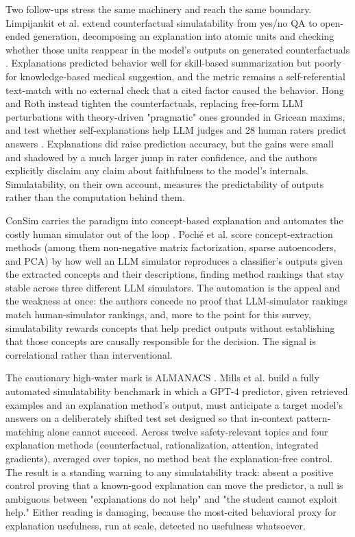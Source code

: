 \documentclass[conference]{IEEEtran}
\begin{document}
Two follow-ups stress the same machinery and reach the same boundary. Limpijankit et al. extend counterfactual simulatability from yes/no QA to open-ended generation, decomposing an explanation into atomic units and checking whether those units reappear in the model's outputs on generated counterfactuals \cite{ref50}. Explanations predicted behavior well for skill-based summarization but poorly for knowledge-based medical suggestion, and the metric remains a self-referential text-match with no external check that a cited factor caused the behavior. Hong and Roth instead tighten the counterfactuals, replacing free-form LLM perturbations with theory-driven "pragmatic" ones grounded in Gricean maxims, and test whether self-explanations help LLM judges and 28 human raters predict answers \cite{ref51}. Explanations did raise prediction accuracy, but the gains were small and shadowed by a much larger jump in rater confidence, and the authors explicitly disclaim any claim about faithfulness to the model's internals. Simulatability, on their own account, measures the predictability of outputs rather than the computation behind them.

ConSim carries the paradigm into concept-based explanation and automates the costly human simulator out of the loop \cite{ref27}. Poché et al. score concept-extraction methods (among them non-negative matrix factorization, sparse autoencoders, and PCA) by how well an LLM simulator reproduces a classifier's outputs given the extracted concepts and their descriptions, finding method rankings that stay stable across three different LLM simulators. The automation is the appeal and the weakness at once: the authors concede no proof that LLM-simulator rankings match human-simulator rankings, and, more to the point for this survey, simulatability rewards concepts that help predict outputs without establishing that those concepts are causally responsible for the decision. The signal is correlational rather than interventional.

The cautionary high-water mark is ALMANACS \cite{ref26}. Mills et al. build a fully automated simulatability benchmark in which a GPT-4 predictor, given retrieved examples and an explanation method's output, must anticipate a target model's answers on a deliberately shifted test set designed so that in-context pattern-matching alone cannot succeed. Across twelve safety-relevant topics and four explanation methods (counterfactual, rationalization, attention, integrated gradients), averaged over topics, no method beat the explanation-free control. The result is a standing warning to any simulatability track: absent a positive control proving that a known-good explanation can move the predictor, a null is ambiguous between "explanations do not help" and "the student cannot exploit help." Either reading is damaging, because the most-cited behavioral proxy for explanation usefulness, run at scale, detected no usefulness whatsoever.
\end{document}
